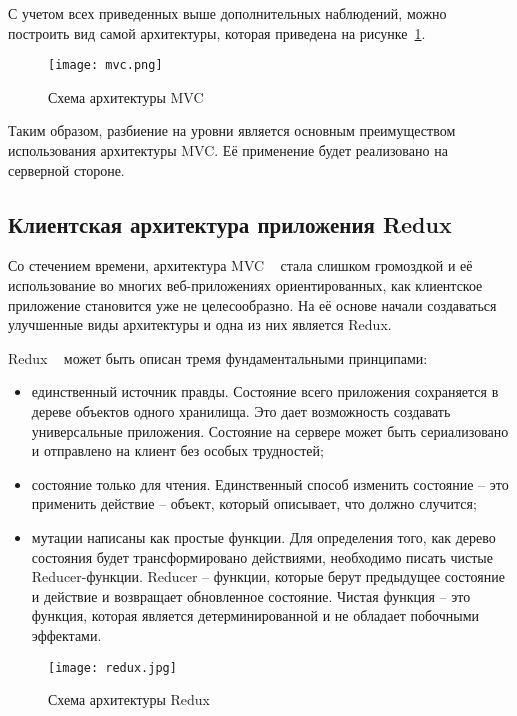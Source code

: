 С учетом всех приведенных выше дополнительных наблюдений, можно построить вид самой архитектуры, которая приведена на рисунке~\ref{fig:domain:manual_structure:credit_net}.

\begin{figure}[ht]
\centering
  \texttt{[image: mvc.png]}  
  \caption{ 
  Схема архитектуры MVC }
  \label{fig:domain:manual_structure:credit_net}
\end{figure}

Таким образом, разбиение на уровни является основным преимуществом использования архитектуры MVC. Её применение будет реализовано на серверной стороне.


\subsection{Клиентская архитектура приложения Redux}
\label{sub:domain:learning_complexity}

Со стечением времени, архитектура MVC ~\cite{mvc} стала слишком громоздкой и её использование во многих веб-приложениях ориентированных, как клиентское приложение становится уже не целесообразно. На её основе начали создаваться улучшенные виды архитектуры и одна из них является Redux.

Redux ~\cite{redux} может быть описан тремя фундаментальными принципами:
 
\begin{itemize}
  \item единственный источник правды. Состояние всего приложения сохраняется в дереве объектов одного хранилища. Это дает возможность создавать универсальные приложения. Состояние на сервере может быть сериализовано и отправлено на клиент без особых трудностей;
  \item состояние только для чтения. Единственный способ изменить состояние – это применить действие – объект, который описывает, что должно случится;
  \item мутации написаны как простые функции. Для определения того, как дерево состояния будет трансформировано действиями, необходимо писать чистые Reducer-функции. Reducer – функции, которые берут предыдущее состояние и действие и возвращает обновленное состояние. Чистая функция – это функция, которая является детерминированной и не обладает побочными эффектами.
\end{itemize}

\begin{figure}[ht]
\centering
  \texttt{[image: redux.jpg]}  
  \caption{ Схема архитектуры Redux }
  \label{fig:domain:manual_structure:credit_redux}
\end{figure}

